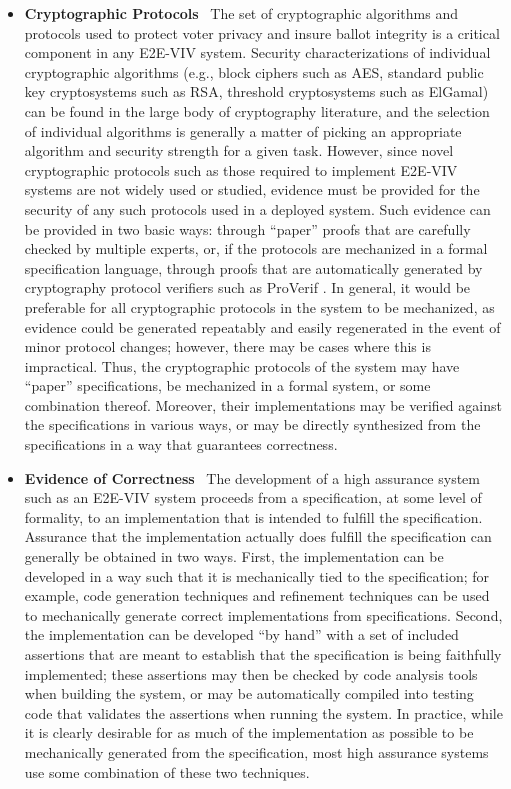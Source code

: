 \begin{itemize}
\item \textbf{Cryptographic Protocols} \ The set of cryptographic
  algorithms and protocols used to protect voter privacy and insure
  ballot integrity is a critical component in any E2E-VIV
  system. Security characterizations of individual cryptographic
  algorithms (e.g., block ciphers such as AES, standard public key
  cryptosystems such as RSA, threshold cryptosystems such as ElGamal)
  can be found in the large body of cryptography literature, and the
  selection of individual algorithms is generally a matter of picking
  an appropriate algorithm and security strength for a given
  task. However, since novel cryptographic protocols such as those
  required to implement E2E-VIV systems are not widely used or studied,
  evidence must be provided for the security of any such protocols
  used in a deployed system. Such evidence can be provided in two
  basic ways: through ``paper'' proofs that are carefully checked by
  multiple experts, or, if the protocols are mechanized in a formal
  specification language, through proofs that are automatically
  generated by cryptography protocol verifiers such as ProVerif
  \cite{ProVerif}. In general, it would be preferable for all
  cryptographic protocols in the system to be mechanized, as evidence
  could be generated repeatably and easily regenerated in the event of
  minor protocol changes; however, there may be cases where this is
  impractical. Thus, the cryptographic protocols of the system may
  have ``paper'' specifications, be mechanized in a formal system, or
  some combination thereof. Moreover, their implementations may be
  verified against the specifications in various ways, or may be
  directly synthesized from the specifications in a way that
  guarantees correctness.

\item \textbf{Evidence of Correctness} \ The development of a high
  assurance system such as an E2E-VIV system proceeds from a
  specification, at some level of formality, to an implementation that
  is intended to fulfill the specification. Assurance that the
  implementation actually does fulfill the specification can generally
  be obtained in two ways. First, the implementation can be developed
  in a way such that it is mechanically tied to the specification; for
  example, code generation techniques and refinement techniques can be
  used to mechanically generate correct implementations from
  specifications. Second, the implementation can be developed ``by
  hand'' with a set of included assertions that are meant to establish
  that the specification is being faithfully implemented; these
  assertions may then be checked by code analysis tools when building
  the system, or may be automatically compiled into testing code that
  validates the assertions when running the system. In practice, while
  it is clearly desirable for as much of the implementation as
  possible to be mechanically generated from the specification, most
  high assurance systems use some combination of these two techniques.


\end{itemize}
